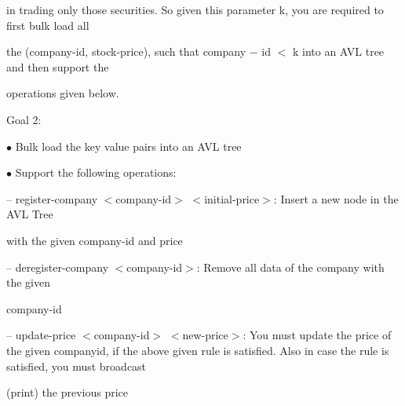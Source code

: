 \documentclass[a4paper,portrait,12pt]{article}
\begin{document}
\begin{flushleft}
in trading only those securities. So given this parameter k, you are required to first bulk load all
\end{flushleft}


\begin{flushleft}
the (company-id, stock-price), such that company $-$ id $<$ k into an AVL tree and then support the
\end{flushleft}


\begin{flushleft}
operations given below.
\end{flushleft}





\begin{flushleft}
Goal 2:
\end{flushleft}


\begin{flushleft}
$\bullet$ Bulk load the key value pairs into an AVL tree
\end{flushleft}


\begin{flushleft}
$\bullet$ Support the following operations:
\end{flushleft}


\begin{flushleft}
-- register-company $<$company-id$>$ $<$initial-price$>$: Insert a new node in the AVL Tree
\end{flushleft}


\begin{flushleft}
with the given company-id and price
\end{flushleft}


\begin{flushleft}
-- deregister-company $<$company-id$>$: Remove all data of the company with the given
\end{flushleft}


\begin{flushleft}
company-id
\end{flushleft}


\begin{flushleft}
-- update-price $<$company-id$>$ $<$new-price$>$: You must update the price of the given companyid, if the above given rule is satisfied. Also in case the rule is satisfied, you must broadcast
\end{flushleft}


\begin{flushleft}
(print) the previous price
\end{flushleft}
\end{document}
